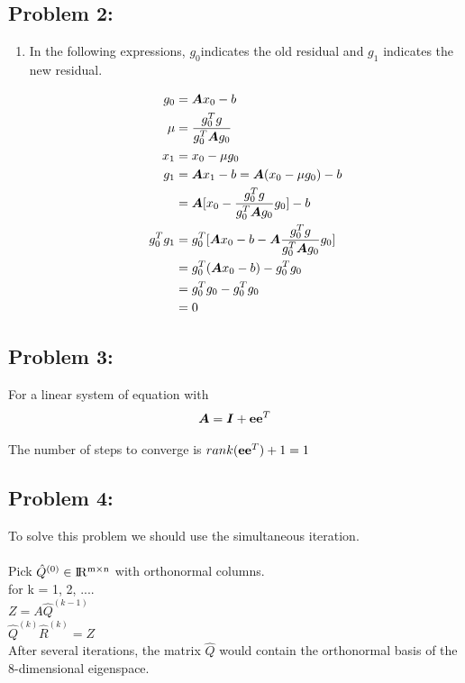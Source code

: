 \documentclass{article}
\newcommand{\forceindent}{\leavevmode{\parindent=1em\indent}}
\begin{document}
\hypertarget{}{}
\subsection*{{Problem 2: }}
\label{}
\begin{enumerate}

\item 
In the following expressions, $g_0$indicates the old residual and $g_1$ indicates the new residual. 

\begin{align*} 
g_0 & =\boldsymbol{A} x_0-b \\
\mu  &= \frac{g_0^Tg}{g_0^T\boldsymbol{A} g_0} \\
x_1 & = x_0 - \mu g_0 \\
g_1 & = \boldsymbol{A} x_1-b = \boldsymbol{A} ( x_0 - \mu g_0) - b  \\
& = \boldsymbol{A} [ x_0-\frac{g_0^Tg}{g_0^T\boldsymbol{A} g_0} g_0] -b \\
g_0^Tg_1 &= g_0^T[\boldsymbol{A} x_0-b - \boldsymbol{A} \frac{g_0^Tg}{g_0^T\boldsymbol{A} g_0} g_0] \\
 & = g_0^T(\boldsymbol{A} x_0 -b) - g_0^Tg_0  \\
 & =  g_0^Tg_0 -  g_0^Tg_0 \\
 & = 0 
\end{align*} 

\end{enumerate}


\hypertarget{}{}
\subsection*{{Problem 3: }}
\label{}

For a linear system of equation with \begin{align*} 
\boldsymbol{A} = \boldsymbol{I} + \boldsymbol{\mathrm{e}} \boldsymbol{\mathrm{e}}^T 
\end{align*}

The number of steps to converge is $ rank(\boldsymbol{\mathrm{e}} \boldsymbol{\mathrm{e}}^T) + 1 = 1$ 

\hypertarget{}{}
\subsection*{{Problem 4: }}
\label{}

To solve this problem we should use the simultaneous iteration. 
\\
\\
Pick $\hat{Q}^{(0)} \in \rm I\!R^ {m \times n}$ with orthonormal columns. \\
for k = 1, 2, ....  \\
\forceindent $Z = A\hat{Q}^{(k-1)}$ \\
\forceindent $\hat{Q}^{(k)}\hat{R}^{(k)} = Z $  \\

After several iterations, the matrix $\hat{Q}$ would contain the orthonormal basis of the 8-dimensional eigenspace. 
\end{document}
